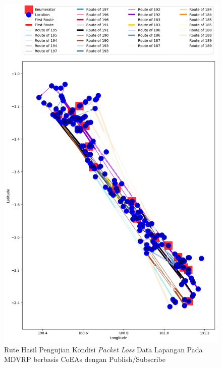 \begin{figure}[H]
	\centering
	\includegraphics[width=\textwidth]{Resources/Images/test_result_normal_field_m15_n182_packet_loss_pubsub_coes}
	\caption{Rute Hasil Pengujian Kondisi \textit{Packet Loss} Data Lapangan Pada MDVRP berbasis CoEAs dengan Publish/Subscribe}
	\label{fig:test_result_packet_loss_field_pubsub_coes}
\end{figure}


